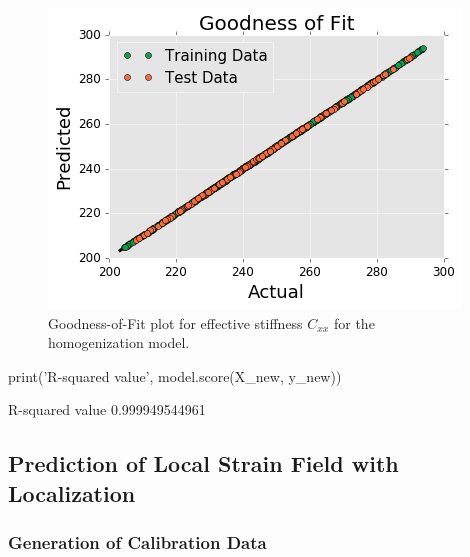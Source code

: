 \documentclass{bmcart}
\newcommand{\fimage}
{\fcolorbox{outcolor}{white}}
{}
\begin{document}
\begin{figure}
    \centering
    \includegraphics[scale=.85]{pymks_paper_homogenization_files/pymks_paper_homogenization_25_0.png}
    \caption{Goodness-of-Fit plot for effective stiffness $C_{xx}$ for the homogenization model.}
    \label{fig:drawGoodnessOfFit}
\end{figure}


\begin{_input}
print('R-squared value', model.score(X_new, y_new))
\end{_input}
\begin{_output}
R-squared value 0.999949544961
\end{_output}

\subsection{Prediction of Local Strain Field with
Localization}\label{prediction-of-local-strain-field-with-localization}

\subsubsection{Generation of Calibration Data}\label{calibration-data-generation}
\end{document}
